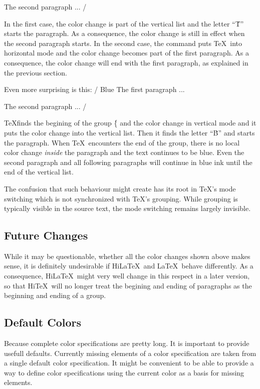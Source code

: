 The second paragraph ...
/
\medskip

In the first case, the color change is part of the vertical list
and the letter ``\.T'' starts the paragraph. 
As a consequence, the color change is still in effect when the second
paragraph starts.
In the second case, the  command puts \TeX\ into horizontal mode
and the color change becomes part of the first paragraph.
As a consequence, the color change will end with the first paragraph, as explained
in the previous section.

Even more surprising is this:
\medskip
\verbatim/{\color{blue} Blue} The first paragraph ...

The second paragraph ...
/
\medskip


\TeX finds the begining of the group \.{\{} and the color change in vertical mode
and it puts the color change into the vertical list. Then it finds the letter
``\.B'' and starts the paragraph. When \TeX\ encounters the end of the group,
there is no local color change {\it inside} the paragraph and the text
continues to be blue. Even the second paragraph and all following paragraphs
will continue in blue ink until the end of the vertical list.

The confusion that such behaviour might create has its root in \TeX's
mode switching which is not synchronized with \TeX's grouping.
While grouping is typically visible in the source text, the mode
switching remains largely invisible. 


\subsection{Future Changes}

While it may be questionable, whether all the color changes shown above
makes sense, it is definitely undesirable if Hi\LaTeX\ and \LaTeX\
behave differently.
As a consequence,  Hi\LaTeX\ might very well change in this respect in a
later version, so that  Hi\TeX\ will no longer treat the begining
and ending of paragraphs as the beginning and ending of a group.

\subsection{Default Colors}
Because complete color specifications are pretty long. It is important
to provide usefull defaults. Currently missing elements of a color specification
are taken from a single default color specification. It might be convenient
to be able to provide a way to define color specifications using the
current color as a basis for missing elements.


